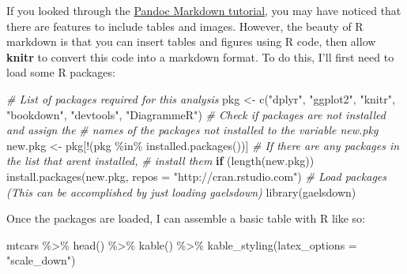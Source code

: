 \documentclass[12pt, oneside]{queensuthesis}
\numberwithin{equation}{chapter}       %
\newenvironment{Shaded}{\begin{snugshade}}{\end{snugshade}}
\newcommand{\AttributeTok}[1]{\textcolor[rgb]{0.77,0.63,0.00}{#1}}
\newcommand{\CommentTok}[1]{\textcolor[rgb]{0.56,0.35,0.01}{\textit{#1}}}
\newcommand{\ControlFlowTok}[1]{\textcolor[rgb]{0.13,0.29,0.53}{\textbf{#1}}}
\newcommand{\FunctionTok}[1]{\textcolor[rgb]{0.00,0.00,0.00}{#1}}
\newcommand{\NormalTok}[1]{#1}
\newcommand{\OtherTok}[1]{\textcolor[rgb]{0.56,0.35,0.01}{#1}}
\newcommand{\SpecialCharTok}[1]{\textcolor[rgb]{0.00,0.00,0.00}{#1}}
\newcommand{\StringTok}[1]{\textcolor[rgb]{0.31,0.60,0.02}{#1}}
\begin{document}
If you looked through the \href{https://rmarkdown.rstudio.com/authoring_pandoc_markdown.html}{Pandoc Markdown tutorial}, you may have noticed that there are features to include tables and images. However, the beauty of R markdown is that you can insert tables and figures using R code, then allow \textbf{knitr} to convert this code into a markdown format. To do this, I'll first need to load some R packages:
\begin{Shaded}
\begin{Highlighting}[]
\CommentTok{\# List of packages required for this analysis}
\NormalTok{pkg }\OtherTok{\textless{}{-}} \FunctionTok{c}\NormalTok{(}\StringTok{"dplyr"}\NormalTok{, }\StringTok{"ggplot2"}\NormalTok{, }\StringTok{"knitr"}\NormalTok{, }\StringTok{"bookdown"}\NormalTok{, }\StringTok{"devtools"}\NormalTok{, }\StringTok{"DiagrammeR"}\NormalTok{)}
\CommentTok{\# Check if packages are not installed and assign the}
\CommentTok{\# names of the packages not installed to the variable new.pkg}
\NormalTok{new.pkg }\OtherTok{\textless{}{-}}\NormalTok{ pkg[}\SpecialCharTok{!}\NormalTok{(pkg }\SpecialCharTok{\%in\%} \FunctionTok{installed.packages}\NormalTok{())]}
\CommentTok{\# If there are any packages in the list that aren\textquotesingle{}t installed,}
\CommentTok{\# install them}
\ControlFlowTok{if}\NormalTok{ (}\FunctionTok{length}\NormalTok{(new.pkg))}
  \FunctionTok{install.packages}\NormalTok{(new.pkg, }\AttributeTok{repos =} \StringTok{"http://cran.rstudio.com"}\NormalTok{)}
\CommentTok{\# Load packages (This can be accomplished by just loading gaelsdown)}
\FunctionTok{library}\NormalTok{(gaelsdown)}
\end{Highlighting}
\end{Shaded}
Once the packages are loaded, I can assemble a basic table with R like so:
\begin{Shaded}
\begin{Highlighting}[]
\NormalTok{mtcars }\SpecialCharTok{\%\textgreater{}\%} \FunctionTok{head}\NormalTok{() }\SpecialCharTok{\%\textgreater{}\%} \FunctionTok{kable}\NormalTok{() }\SpecialCharTok{\%\textgreater{}\%} \FunctionTok{kable\_styling}\NormalTok{(}\AttributeTok{latex\_options =} \StringTok{"scale\_down"}\NormalTok{)}
\end{Highlighting}
\end{Shaded}
\end{document}
